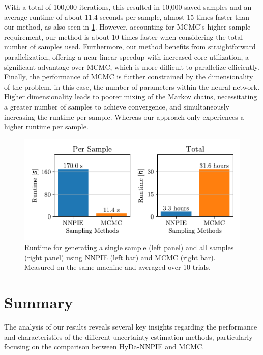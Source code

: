 With a total of 100,000 iterations, this resulted in 10,000 saved samples and an average runtime of about 11.4 seconds per sample, almost 15 times faster than our method, as also seen in \cref{fig:runtime_comparison}. However, accounting for MCMC's higher sample requirement, our method is about 10 times faster when considering the total number of samples used. Furthermore, our method benefits from straightforward parallelization, offering a near-linear speedup with increased core utilization, a significant advantage over MCMC, which is more difficult to parallelize efficiently.
Finally, the performance of MCMC is further constrained by the dimensionality of the problem, in this case, the number of parameters within the neural network. Higher dimensionality leads to poorer mixing of the Markov chains, necessitating a greater number of samples to achieve convergence, and simultaneously increasing the runtime per sample. Whereas our approach only experiences a higher runtime per sample.

\begin{figure}[h]
    \centering
    \includegraphics{figs/runtime_comparison.pdf}
    \caption{Runtime for generating a single sample (left panel) and all samples (right panel) using NNPIE (left bar) and MCMC (right bar). Measured on the same machine and averaged over 10 trials.}
    \label{fig:runtime_comparison}
\end{figure}



\section{Summary}
The analysis of our results reveals several key insights regarding the performance and characteristics of the different uncertainty estimation methods, particularly focusing on the comparison between HyDa-NNPIE and MCMC.

